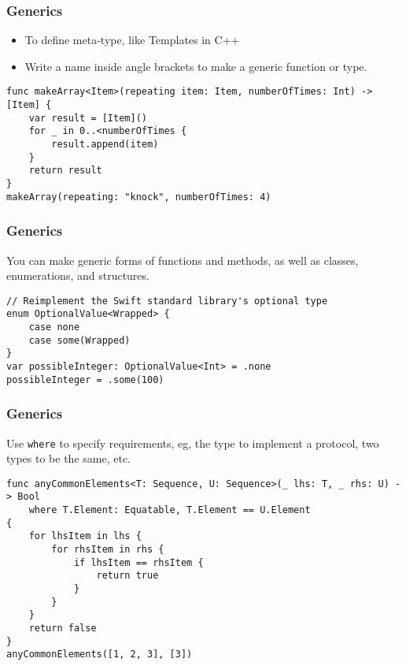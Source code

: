 \begin{frame}[fragile] \frametitle{Generics}

\begin{itemize}
\item To define meta-type, like Templates in C++
\item Write a name inside angle brackets to make a generic function or type.
\end{itemize}

\begin{lstlisting}[basicstyle=\scriptsize]
func makeArray<Item>(repeating item: Item, numberOfTimes: Int) -> [Item] {
    var result = [Item]()
    for _ in 0..<numberOfTimes {
        result.append(item)
    }
    return result
}
makeArray(repeating: "knock", numberOfTimes: 4)
\end{lstlisting}
\end{frame}

\begin{frame}[fragile] \frametitle{Generics}

You can make generic forms of functions and methods, as well as classes, enumerations, and structures.

\begin{lstlisting}[basicstyle=\scriptsize]
// Reimplement the Swift standard library's optional type
enum OptionalValue<Wrapped> {
    case none
    case some(Wrapped)
}
var possibleInteger: OptionalValue<Int> = .none
possibleInteger = .some(100)
\end{lstlisting}
\end{frame}

\begin{frame}[fragile] \frametitle{Generics}

Use \lstinline|where| to specify requirements, eg, the type to implement a protocol, two types to be the same, etc.

\begin{lstlisting}[basicstyle=\scriptsize]
func anyCommonElements<T: Sequence, U: Sequence>(_ lhs: T, _ rhs: U) -> Bool
    where T.Element: Equatable, T.Element == U.Element
{
    for lhsItem in lhs {
        for rhsItem in rhs {
            if lhsItem == rhsItem {
                return true
            }
        }
    }
    return false
}
anyCommonElements([1, 2, 3], [3])
\end{lstlisting}
\end{frame}


